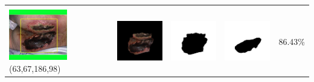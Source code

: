 \begin{table}[H]
\begin{tabular}{|m{1.0in}|m{1.0in}|m{1.0in}|m{1.0in}|m{0.6in}|}
		&  &  & \\
		\includegraphics[width=1.0in]{gambar/hasil_segmentasi/luka_hitam/image_39_rect.jpg} {\centering\fontsize{10}{10}\selectfont(63,67,186,98)}&
		\includegraphics[width=1.0in]{gambar/hasil_segmentasi/luka_hitam/result_39.jpg}&
		\includegraphics[width=1.0in]{gambar/hasil_segmentasi/luka_hitam/mask_r_39.jpg}&
		\includegraphics[width=1.0in]{gambar/hasil_segmentasi/luka_hitam/39_r.jpg}&
		86.43\% \\
		\hline 


	\end{tabular}
\end{table}